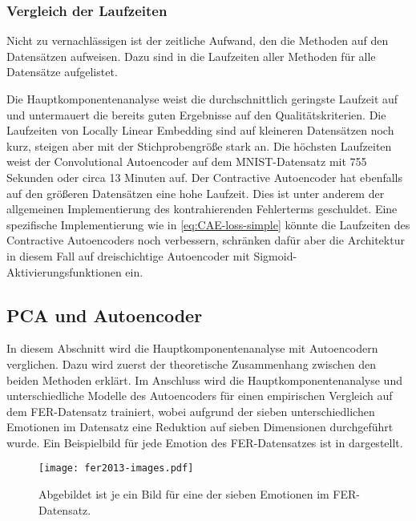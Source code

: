 \subsubsection{Vergleich der Laufzeiten}

Nicht zu vernachlässigen ist der zeitliche Aufwand, den die Methoden auf den Datensätzen aufweisen.
Dazu sind in  die Laufzeiten aller Methoden für alle Datensätze
aufgelistet.


Die Hauptkomponentenanalyse weist die durchschnittlich geringste Laufzeit auf und untermauert die bereits guten Ergebnisse auf den Qualitätskriterien. Die Laufzeiten von Locally Linear Embedding sind auf kleineren Datensätzen noch kurz, steigen aber mit der Stichprobengröße stark an. Die höchsten Laufzeiten weist der Convolutional Autoencoder auf dem MNIST-Datensatz mit 755 Sekunden oder circa 13 Minuten auf. Der Contractive Autoencoder hat ebenfalls auf den größeren Datensätzen eine hohe Laufzeit. Dies ist unter anderem der allgemeinen Implementierung des kontrahierenden Fehlerterms geschuldet. Eine spezifische Implementierung wie in \eqref{eq:CAE-loss-simple} könnte die Laufzeiten des Contractive Autoencoders noch verbessern, schränken dafür aber die Architektur in diesem Fall auf dreischichtige Autoencoder mit Sigmoid-Aktivierungsfunktionen ein.

\subsection{PCA und Autoencoder}
\label{ch:Vergleich:sec:Resultate:PCA_AE}

In diesem Abschnitt wird die Hauptkomponentenanalyse mit Autoencodern verglichen. Dazu wird zuerst
der theoretische Zusammenhang zwischen den beiden Methoden erklärt. Im Anschluss wird die
Hauptkomponentenanalyse und unterschiedliche Modelle des Autoencoders für einen empirischen
Vergleich auf dem FER-Datensatz trainiert, wobei aufgrund der sieben unterschiedlichen Emotionen im
Datensatz eine Reduktion auf sieben Dimensionen durchgeführt wurde. Ein Beispielbild für jede
Emotion des FER-Datensatzes ist in  dargestellt.

\begin{figure}[ht]
	\centering
	\texttt{[image: fer2013-images.pdf]}
	\caption[Beispielbilder des FER-Datensatzes]{Abgebildet ist je ein Bild für eine der sieben Emotionen im FER-Datensatz.}
	\label{fig:FER-Datensatz-Beispiele}
\end{figure}

